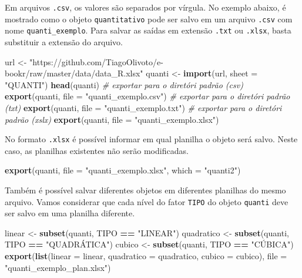 \documentclass[
]{book}
\newenvironment{Shaded}{\begin{snugshade}}{\end{snugshade}}
\newcommand{\CommentTok}[1]{\textcolor[rgb]{0.56,0.35,0.01}{\textit{#1}}}
\newcommand{\DataTypeTok}[1]{\textcolor[rgb]{0.13,0.29,0.53}{#1}}
\newcommand{\KeywordTok}[1]{\textcolor[rgb]{0.13,0.29,0.53}{\textbf{#1}}}
\newcommand{\NormalTok}[1]{#1}
\newcommand{\OperatorTok}[1]{\textcolor[rgb]{0.81,0.36,0.00}{\textbf{#1}}}
\newcommand{\StringTok}[1]{\textcolor[rgb]{0.31,0.60,0.02}{#1}}
\numberwithin{equation}{section}
\begin{document}
Em arquivos \texttt{.csv}, os valores são separados por vírgula. No exemplo abaixo, é mostrado como o objeto \texttt{quantitativo} pode ser salvo em um arquivo \texttt{.csv} com nome \texttt{quanti\_exemplo}. Para salvar as saídas em extensão \texttt{.txt} ou \texttt{.xlsx}, basta substituir a extensão do arquivo.

\begin{Shaded}
\begin{Highlighting}[]
\NormalTok{url \textless{}{-}}\StringTok{ "https://github.com/TiagoOlivoto/e{-}bookr/raw/master/data/data\_R.xlsx"}
\NormalTok{quanti \textless{}{-}}\StringTok{ }\KeywordTok{import}\NormalTok{(url, }\DataTypeTok{sheet =} \StringTok{"QUANTI"}\NormalTok{)}
\KeywordTok{head}\NormalTok{(quanti)}
\CommentTok{\# exportar para o diretóri padrão (csv)}
\KeywordTok{export}\NormalTok{(quanti, }\DataTypeTok{file =} \StringTok{"quanti\_exemplo.csv"}\NormalTok{)}
\CommentTok{\# exportar para o diretóri padrão (txt)}
\KeywordTok{export}\NormalTok{(quanti, }\DataTypeTok{file =} \StringTok{"quanti\_exemplo.txt"}\NormalTok{)}
\CommentTok{\# exportar para o diretóri padrão (xslx)}
\KeywordTok{export}\NormalTok{(quanti, }\DataTypeTok{file =} \StringTok{"quanti\_exemplo.xlsx"}\NormalTok{)}
\end{Highlighting}
\end{Shaded}

No formato \texttt{.xlsx} é possível informar em qual planilha o objeto será salvo. Neste caso, as planilhas existentes não serão modificadas.

\begin{Shaded}
\begin{Highlighting}[]
\KeywordTok{export}\NormalTok{(quanti, }\DataTypeTok{file =} \StringTok{"quanti\_exemplo.xlsx"}\NormalTok{, }\DataTypeTok{which =} \StringTok{"quanti2"}\NormalTok{)}
\end{Highlighting}
\end{Shaded}

Também é possível salvar diferentes objetos em diferentes planilhas do mesmo arquivo. Vamos considerar que cada nível do fator \texttt{TIPO} do objeto \texttt{quanti} deve ser salvo em uma planilha diferente.

\begin{Shaded}
\begin{Highlighting}[]
\NormalTok{linear \textless{}{-}}\StringTok{ }\KeywordTok{subset}\NormalTok{(quanti, TIPO }\OperatorTok{==}\StringTok{ "LINEAR"}\NormalTok{)}
\NormalTok{quadratico \textless{}{-}}\StringTok{ }\KeywordTok{subset}\NormalTok{(quanti, TIPO }\OperatorTok{==}\StringTok{ "QUADRÁTICA"}\NormalTok{)}
\NormalTok{cubico \textless{}{-}}\StringTok{ }\KeywordTok{subset}\NormalTok{(quanti, TIPO }\OperatorTok{==}\StringTok{ "CÚBICA"}\NormalTok{)}
\KeywordTok{export}\NormalTok{(}\KeywordTok{list}\NormalTok{(}\DataTypeTok{linear =}\NormalTok{ linear,}
            \DataTypeTok{quadratico =}\NormalTok{ quadratico, }
            \DataTypeTok{cubico =}\NormalTok{ cubico),}
       \DataTypeTok{file =} \StringTok{"quanti\_exemplo\_plan.xlsx"}\NormalTok{)}
\end{Highlighting}
\end{Shaded}
\end{document}
